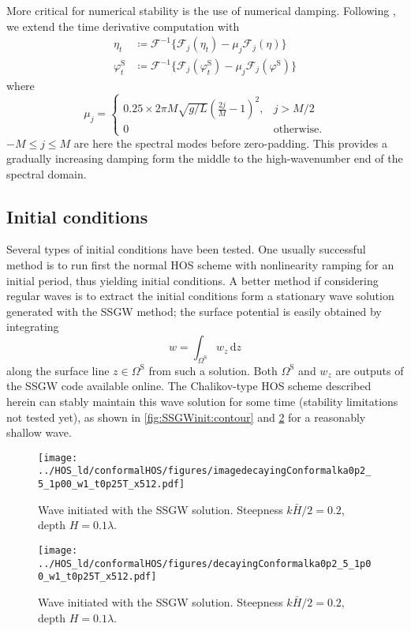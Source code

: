 \documentclass[a4paper,12pt]{article}
\newcommand{\mr}{\mathrm}
\newcommand{\mc}{\mathcal}
\renewcommand{\S}{^\mr{S}}
\renewcommand{\_}[1]{_\mr{#1}}
\newcommand{\w}{w}
\newcommand{\rbr}[1]{\left(#1\right)}
\newcommand{\z}{z}
\renewcommand{\w}{w}
\newcommand{\FF}{\mc F}
\begin{document}
More critical for numerical stability is the use of numerical damping.
Following \citet{chalikov2005modeling}, we extend the time derivative computation with
\begin{subequations}
\begin{align}
\eta_t &\coloneqq \FF^{-1}\{\FF_j(\eta_t) - \mu_j \FF_j(\eta) \}\\
\varphi\S_t &\coloneqq  \FF^{-1}\{\FF_j(\varphi\S_t) - \mu_j \FF_j(\varphi\S) \}
\end{align}%
\label{eq:damping}%
\end{subequations}
where 
\begin{equation}
\mu_j = \begin{cases}
0.25\times 2\pi M \sqrt{g/L}\rbr{\frac{2j}{M}-1}^2,& j> M/2\\
0 & \text{otherwise.}
\end{cases}
\label{eq:damping_nu}
\end{equation}
$-M\leq j \leq M$ are here the spectral modes before zero-padding.
This provides a gradually increasing damping form the middle to the high-wavenumber end of the spectral domain.


\subsection*{Initial conditions}
Several types of initial conditions have been tested. 
One usually successful method is to run first the normal HOS scheme with nonlinearity ramping for an initial period, thus yielding initial conditions.
A better method if considering regular waves is to extract the initial conditions form a stationary wave solution generated with the SSGW \citep{clamond2018accurate} method;
the surface potential is easily obtained by integrating
\[\w = \int_{\Omega\S}\! \w_\z \,\mr d z\] 
along the surface line $z\in\Omega\S$ from such a solution. 
Both $\Omega\S$ and  $\w_\z$ are outputs of the SSGW code available online. 
The Chalikov-type HOS scheme described herein can stably maintain this wave solution for some time (stability limitations not tested yet), as shown in \autoref{fig:SSGWinit:contour} and \ref{fig:SSGWinit:eta} for a reasonably shallow wave. 


\begin{figure}[h!ptb]%
\centering
\texttt{[image: ../HOS\_old/conformalHOS/figures/imagedecayingConformalka0p2\_M5\_h1p00\_Nw1\_dt0p25T\_nx512.pdf]}%
\caption{Wave initiated with the SSGW solution. Steepness $k\bar H/2=0.2$, depth $H=0.1\lambda$.}%
\label{fig:SSGWinit:contour}%
\end{figure}
\begin{figure}[h!ptb]%
\centering
\texttt{[image: ../HOS\_old/conformalHOS/figures/decayingConformalka0p2\_M5\_h1p00\_Nw1\_dt0p25T\_nx512.pdf]}%
\caption{Wave initiated with the SSGW solution. Steepness $k\bar H/2=0.2$, depth $H=0.1\lambda$.}%
\label{fig:SSGWinit:eta}%
\end{figure}
\end{document}
